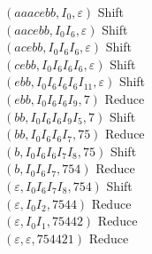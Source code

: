 \noindent $(aaacebb, I_0, \varepsilon)$ Shift\\ 
$(aacebb, I_0 I_6, \varepsilon)$ Shift\\
$(acebb, I_0 I_6 I_6, \varepsilon)$ Shift\\
$(cebb, I_0 I_6 I_6 I_6 , \varepsilon)$ Shift\\
$(ebb, I_0 I_6 I_6 I_6 I_{11}, \varepsilon)$ Shift\\
$(ebb, I_0 I_6 I_6 I_9 , 7)$ Reduce\\
$(bb, I_0 I_6 I_6 I_9 I_5, 7)$ Shift\\
$(bb, I_0 I_6 I_6 I_7, 75)$ Reduce\\
$(b, I_0 I_6 I_6 I_7 I_8, 75)$ Shift\\
$(b, I_0 I_6 I_7, 754)$ Reduce\\
$(\varepsilon, I_0 I_6 I_7 I_8, 754)$ Shift\\
$(\varepsilon, I_0 I_2, 7544)$ Reduce\\
$(\varepsilon, I_0 I_1, 75442)$ Reduce\\
$(\varepsilon,\varepsilon, 754421)$ Reduce\\
